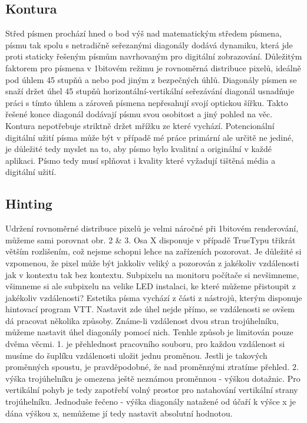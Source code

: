 \documentclass[a4paper]{article}
\begin{document}
\subsection{Kontura}
Střed písmen prochází hned o bod výš nad matematickým středem písmena, písmu tak spolu s netradičně seřezanými diagonály dodává dynamiku, která jde proti staticky řešeným písmům navrhovaným pro digitální zobrazování. Důležitým faktorem pro písmena v 1bitovém režimu je rovnoměrná distribuce pixelů, ideálně pod úhlem 45 stupňů a nebo pod jiným z bezpečných úhlů. Diagonály písmen se snaží držet úhel 45 stupňů horizontální-vertikální seřezávání diagonál usnadňuje práci s tímto úhlem a zároveň písmena nepřesahují svojí optickou šířku. Takto řešené konce diagonál dodávají písmu svou osobitost a jiný pohled na věc. Kontura nepotřebuje striktně držet mřížku ze které vychází. Potencionální digitální užití písma může být v případě mé práce primární ale určitě ne jediné, je důležité tedy myslet na to, aby písmo bylo kvalitní a originální v každé aplikaci. Písmo tedy musí splňovat i kvality které vyžadují tištěná média a digitální užití.
\subsection{Hinting}
Udržení rovnoměrné distribuce pixelů je velmi náročné při 1bitovém renderování, můžeme sami porovnat obr. 2 \& 3. Osa X disponuje v případě TrueTypu třikrát větším rozlišením, což nejsme schopni lehce na zařízeních pozorovat. Je důležité si vzpomenou, že pixel může být jakkoliv veliký a pozorován z jakékoliv vzdálenosti jak v kontextu tak bez kontextu. Subpixelu na monitoru počítače si nevšimneme, všimneme si ale subpixelu na velike LED instalaci, ke které můžeme přistoupit z jakékoliv vzdálenosti? Estetika písma vychází z části z nástrojů, kterým disponuje hintovací program VTT. Nastavit zde úhel nejde přímo, se vzdálenosti se ovšem dá pracovat několika způsoby. Známe-li vzdálenost dvou stran trojúhelníku, můžeme nastavit úhel diagonály pomocí nich. Tenhle způsob je limitován pouze dvěma věcmi. 1. je přehlednost pracovního souboru, pro každou vzdálenost si musíme do šuplíku vzdálenosti uložit jednu proměnou. Jestli je takových proměnných spoustu, je pravděpodobné, že nad proměnnými ztratíme přehled. 2. výška trojúhelníku je omezena ještě neznámou proměnnou - výškou dotažnic. Pro vertikální pohyb je tedy zapotřebí volný prostor pro natahování vertikální strany trojúhelníku. Jednoduše řečeno - výška diagonály natažené od účaří k výšce x je dána výškou x, nemůžeme jí tedy nastavit absolutní hodnotou.
\end{document}
